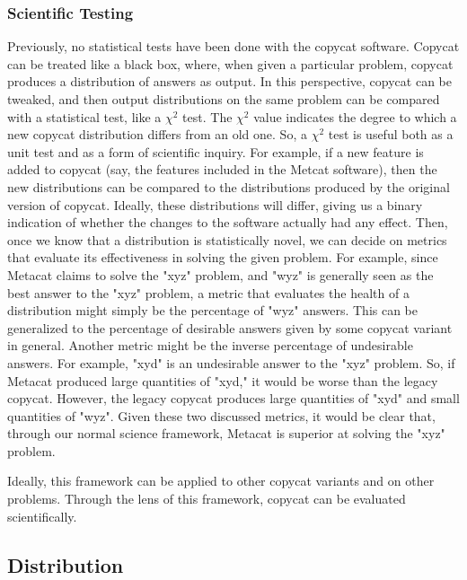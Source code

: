 \documentclass[a4paper]{article}
\begin{document}
        \subsubsection{Scientific Testing}
            Previously, no statistical tests have been done with the copycat software.
            Copycat can be treated like a black box, where, when given a particular problem, copycat produces a distribution of answers as output.
            In this perspective, copycat can be tweaked, and then output distributions on the same problem can be compared with a statistical test, like a $\chi^2$ test.
            The $\chi^2$ value indicates the degree to which a new copycat distribution differs from an old one.
            So, a $\chi^2$ test is useful both as a unit test and as a form of scientific inquiry.
            For example, if a new feature is added to copycat (say, the features included in the Metcat software), then the new distributions can be compared to the distributions produced by the original version of copycat.
            Ideally, these distributions will differ, giving us a binary indication of whether the changes to the software actually had any effect.
            Then, once we know that a distribution is statistically novel, we can decide on metrics that evaluate its effectiveness in solving the given problem.
            For example, since Metacat claims to solve the "xyz" problem, and "wyz" is generally seen as the best answer to the "xyz" problem, a metric that evaluates the health of a distribution might simply be the percentage of "wyz" answers.
            This can be generalized to the percentage of desirable answers given by some copycat variant in general.
            Another metric might be the inverse percentage of undesirable answers. 
            For example, "xyd" is an undesirable answer to the "xyz" problem.
            So, if Metacat produced large quantities of "xyd," it would be worse than the legacy copycat.
            However, the legacy copycat produces large quantities of "xyd" and small quantities of "wyz".
            Given these two discussed metrics, it would be clear that, through our normal science framework, Metacat is superior at solving the "xyz" problem.

            Ideally, this framework can be applied to other copycat variants and on other problems.
            Through the lens of this framework, copycat can be evaluated scientifically.
    \subsection{Distribution}
\end{document}

